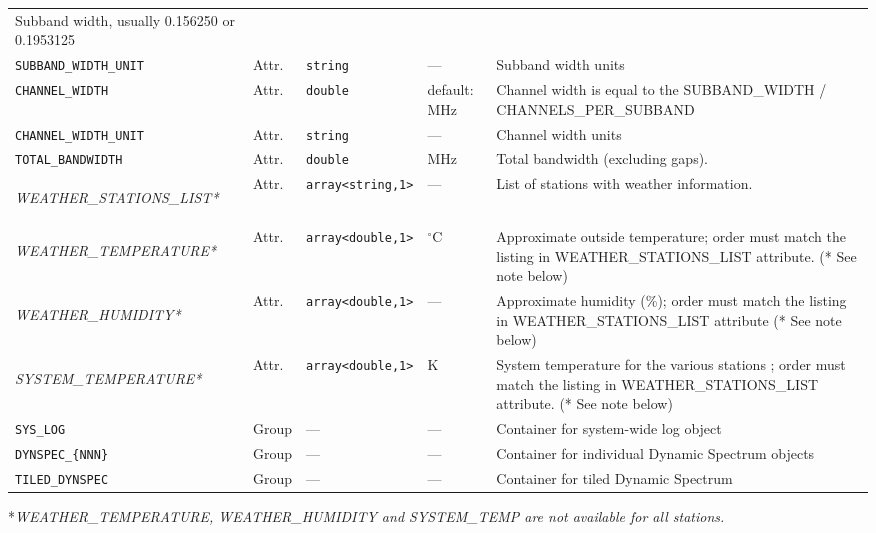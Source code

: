 \documentclass[a4paper,10pt,bibtotoc]{scrartcl}
\begin{document}
\begin{supertabular}{|llllp{5cm}|}
  Subband width, usually
    0.156250 or 0.1953125 \\
  \small{\verb|SUBBAND_WIDTH_UNIT|}  & Attr.  & \verb|string| & --- & Subband width
    units \\
  \small{\verb|CHANNEL_WIDTH|}   & Attr.  & \verb|double|  &  default: MHz & Channel width is
    equal to the SUBBAND\_WIDTH / CHANNELS\_PER\_SUBBAND \\
  \small{\verb|CHANNEL_WIDTH_UNIT|}  & Attr.  & \verb|string| & --- & Channel
    width units \\
  \small{\verb|TOTAL_BANDWIDTH|} & Attr. & \verb|double| & MHz & Total bandwidth (excluding gaps). \\
  \begin{scriptsize}\textit{WEATHER\_STATIONS\_LIST*} \end{scriptsize}& Attr. & \verb|array<string,1>| & --- & List of stations with weather information. \\
  \begin{scriptsize}\textit{WEATHER\_TEMPERATURE*}\end{scriptsize} & Attr. & \verb|array<double,1>| & $^\circ $C & Approximate
  outside temperature;  order must match the listing in WEATHER\_STATIONS\_LIST attribute.  (* See note below) \\
  \begin{scriptsize}\textit{WEATHER\_HUMIDITY*} \end{scriptsize}& Attr. & \verb|array<double,1>| & --- & Approximate humidity 
  (\%);  order must match the listing in WEATHER\_STATIONS\_LIST attribute (* See note below) \\
  \begin{scriptsize}\textit{SYSTEM\_TEMPERATURE*} \end{scriptsize}& Attr. &
  \verb|array<double,1>| & K & System temperature for the various 
  stations ;  order must match the listing in WEATHER\_STATIONS\_LIST attribute.  (* See note below) \\
  \hline
  \small{\verb|SYS_LOG|} & Group & --- & --- &   Container for system-wide log object \\
  \small{\verb|DYNSPEC_{NNN}|} & Group & --- & --- & Container for individual
    Dynamic Spectrum objects \\
  \small{\verb|TILED_DYNSPEC|} & Group & --- & --- & Container for tiled
    Dynamic Spectrum \\
  \hline
\end{supertabular}
\begin{small}
\begin{flushleft}
  *\textit{WEATHER\_TEMPERATURE, WEATHER\_HUMIDITY and SYSTEM\_TEMP are not available for all stations.}
\end{flushleft}
\end{small}
\end{document}
